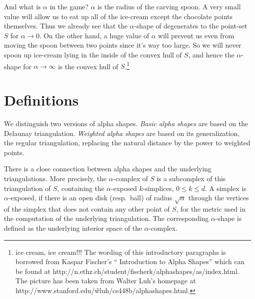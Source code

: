 And what is $\alpha$ in the game?  $\alpha$ is the radius of the
carving spoon. A very small value will allow us to eat up all of the
ice-cream except the chocolate points themselves. Thus we already see
that the $\alpha$-shape of degenerates to the point-set $S$ for
$\alpha \rightarrow 0$. On the other hand, a huge value of $\alpha$
will prevent us even from moving the spoon between two points since
it's way too large. So we will never spoon up ice-cream lying in the
inside of the convex hull of $S$, and hence the $\alpha$-shape for
$\alpha \rightarrow \infty$ is the convex hull of $S$.\footnote{ice cream, ice cream!!!
The wording of this introductory paragraphs is borrowed from  Kaspar Fischer's
`` Introduction to Alpha Shapes'' which can be found at 
http://n.ethz.ch/student/fischerk/alphashapes/as/index.html.
The picture has been taken from Walter Luh's homepage at
http://www.stanford.edu/\~wluh/cs448b/alphashapes.html.}


\section{Definitions}


We distinguish two versions of alpha shapes.  {\em Basic alpha shapes}
are based on the Delaunay triangulation.  {\em Weighted alpha shapes}
are based on its generalization, the regular triangulation, replacing
the natural distance by the power to weighted points. 


There is a close connection between alpha shapes and the underlying
triangulations. More precisely, the $\alpha$-complex of $S$ is a
subcomplex of this triangulation of $S$, containing the $\alpha$-exposed
$k$-simplices, $0 \leq k \leq d$. A simplex is $\alpha$-exposed, if there is an
open disk (resp.\ ball) of radius $\sqrt{\alpha}$ through the vertices of the
simplex that does not contain any other point of $S$, for the metric used in
the computation of the underlying triangulation.  The corresponding
$\alpha$-shape is defined as the underlying interior space of the
$\alpha$-complex. 

